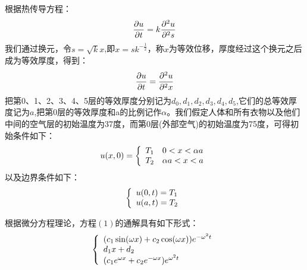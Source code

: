 \documentclass[bwprint]{cumcmthesis}
\begin{document}
  \indent 根据热传导方程：
  \begin{equation}
      \centering
      \frac{\partial u}{\partial t}=k\frac{\partial^{2}u}{\partial^{2}s}
  \end{equation}
  \indent 我们通过换元，令$s=\sqrt{k}x$,即$x=sk^{-\frac{1}{2}}$，称$x$为等效位移，厚度经过这个换元之后成为等效厚度，得到：
  \begin{equation}
      \centering
      \frac{\partial u}{\partial t}=\frac{\partial^{2}u}{\partial^{2}x}
  \end{equation}
  \indent 把第0、1、2、3、4、5层的等效厚度分别记为$d_0,d_1,d_2,d_3,d_4,d_5$,它们的总等效厚度记为$a$,把第0层的等效厚度和a的比例记作$\alpha$。我们假定人体和所有衣物以及他们中间的空气层的初始温度为37度，而第0层(外部空气)的初始温度为75度，可得初始条件如下：
  \begin{equation}  
    \centering
    u(x,0)=\left\{  
     \begin{array}{lr}  
        T_{1}\quad0<x<\alpha a \\   
        T_{2}\quad\alpha a<x<a 
     \end{array}  
    \right.
\end{equation} 
    \indent 以及边界条件如下：
    \begin{equation}
        \centering
        \left\{  
     \begin{array}{lr}  
        u(0,t)=T_{1} \\   
        u(a,t)=T_{2}
     \end{array}  
    \right.
\end{equation}
  
    \indent 根据微分方程理论，方程$(1)$的通解具有如下形式：
    \begin{equation}
        \centering
        \left\{  
     \begin{array}{lr}  
        (c_{1}\sin(\omega x)+c_{2}\cos(\omega x))e^{-\omega^{2}t} \\   
        d_{1}x+d_{2} \\
        (c_{1}e^{\omega x}+c_{2}e^{-\omega x})e^{\omega^{2}t}
     \end{array}  
    \right.
    \end{equation}
    
\end{document}
